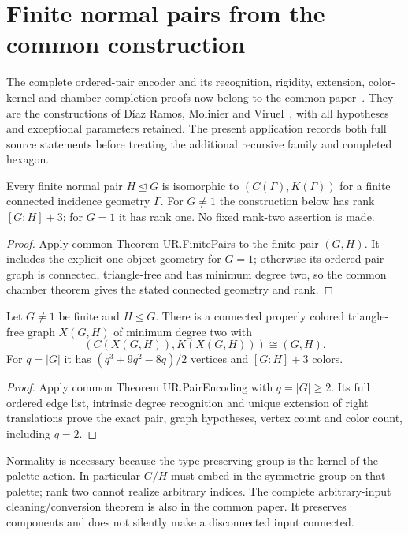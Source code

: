 \section{Finite normal pairs from the common construction}
\label{sec:pairs}
The complete ordered-pair encoder and its recognition, rigidity, extension,
color-kernel and chamber-completion proofs now belong to the common
paper~\cite{Recognition}. They are the constructions of D\'iaz Ramos,
Molinier and Viruel~\cite[Theorem 3.1 and Theorem A]{DMV}, with all
hypotheses and exceptional parameters retained. The present application
records both full source statements before treating the additional
recursive family and completed hexagon.

\begin{theorem}\label{R.FinitePairs}
Every finite normal pair $H\mathrel{\trianglelefteq}G$ is isomorphic to
$(C(\Gamma),K(\Gamma))$ for a finite connected incidence geometry $\Gamma$.
For $G\ne1$ the construction below has rank $[G:H]+3$; for $G=1$ it has rank
one. No fixed rank-two assertion is made.
\end{theorem}
\begin{proof}
Apply common Theorem UR.FinitePairs to the finite pair $(G,H)$.
It includes the explicit one-object geometry for $G=1$; otherwise its
ordered-pair graph is connected, triangle-free and has minimum degree two,
so the common chamber theorem gives the stated connected geometry and rank.
\end{proof}

\begin{theorem}\label{R.PairEncoding}
Let $G\ne1$ be finite and $H\mathrel{\trianglelefteq}G$. There is a connected
properly colored triangle-free graph $X(G,H)$ of minimum degree two with
\[
 (C(X(G,H)),K(X(G,H)))\cong(G,H).
\]
For $q=|G|$ it has $(q^3+9q^2-8q)/2$ vertices and $[G:H]+3$ colors.
\end{theorem}
\begin{proof}
Apply common Theorem UR.PairEncoding with $q=|G|\ge2$.
Its full ordered edge list, intrinsic degree recognition and unique
extension of right translations prove the exact pair, graph hypotheses,
vertex count and color count, including $q=2$.
\end{proof}

Normality is necessary because the type-preserving group is the kernel
of the palette action. In particular $G/H$ must embed in the symmetric
group on that palette; rank two cannot realize arbitrary indices.
The complete arbitrary-input cleaning/conversion theorem is also in the
common paper. It preserves components and does not silently make a
disconnected input connected.
